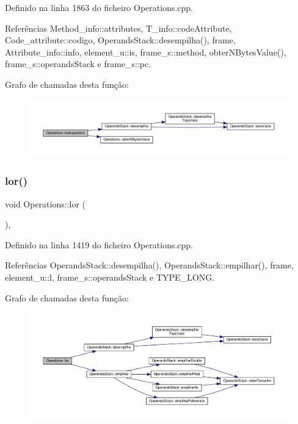 Definido na linha 1863 do ficheiro Operations.\+cpp.



Referências Method\+\_\+info\+::attributes, T\+\_\+info\+::code\+Attribute, Code\+\_\+attribute\+::codigo, Operands\+Stack\+::desempilha(), frame, Attribute\+\_\+info\+::info, element\+\_\+u\+::is, frame\+\_\+s\+::method, obter\+N\+Bytes\+Value(), frame\+\_\+s\+::operands\+Stack e frame\+\_\+s\+::pc.

Grafo de chamadas desta função\+:\nopagebreak
\begin{figure}[H]
\begin{center}
\leavevmode
\includegraphics[width=350pt]{classOperations_a0458ee466daff63a3698973c89cfe71a_cgraph}
\end{center}
\end{figure}
\mbox{\label{classOperations_a89193dfaaa2c4c45f320c6b9f0b5601c}} 
\subsubsection{\texorpdfstring{lor()}{lor()}}
{\footnotesize\ttfamily void Operations\+::lor (\begin{DoxyParamCaption}{ }\end{DoxyParamCaption})\hspace{0.3cm}{\ttfamily [static]}, {\ttfamily [private]}}



Definido na linha 1419 do ficheiro Operations.\+cpp.



Referências Operands\+Stack\+::desempilha(), Operands\+Stack\+::empilhar(), frame, element\+\_\+u\+::l, frame\+\_\+s\+::operands\+Stack e T\+Y\+P\+E\+\_\+\+L\+O\+NG.

Grafo de chamadas desta função\+:\nopagebreak
\begin{figure}[H]
\begin{center}
\leavevmode
\includegraphics[width=350pt]{classOperations_a89193dfaaa2c4c45f320c6b9f0b5601c_cgraph}
\end{center}
\end{figure}
\mbox{\label{classOperations_a437e4b34f2f1be8982d36f0cdf47f98c}} 
